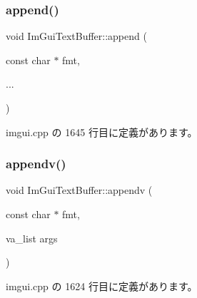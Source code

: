 \subsubsection{\texorpdfstring{append()}{append()}}
{\footnotesize\ttfamily void Im\+Gui\+Text\+Buffer\+::append (\begin{DoxyParamCaption}\item[{const char $\ast$}]{fmt,  }\item[{}]{... }\end{DoxyParamCaption})}



 imgui.\+cpp の 1645 行目に定義があります。

\mbox{\label{struct_im_gui_text_buffer_ad7c7e0d7ec1a12dd2a96a3dbb204deaf}} 
\subsubsection{\texorpdfstring{appendv()}{appendv()}}
{\footnotesize\ttfamily void Im\+Gui\+Text\+Buffer\+::appendv (\begin{DoxyParamCaption}\item[{const char $\ast$}]{fmt,  }\item[{va\+\_\+list}]{args }\end{DoxyParamCaption})}



 imgui.\+cpp の 1624 行目に定義があります。

